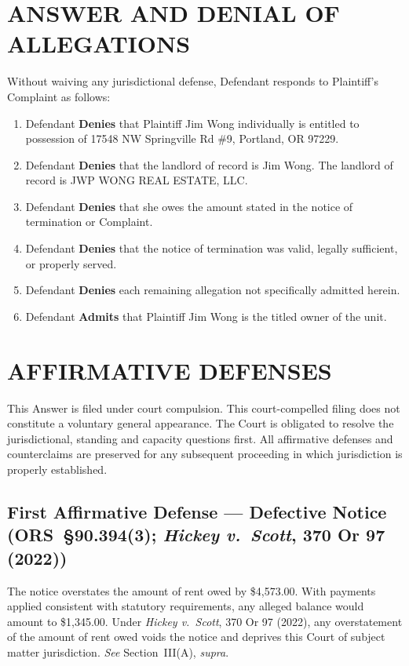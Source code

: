 \documentclass[10pt,letterpaper,oneside]{extarticle}
\begin{document}
\section{\textbf{ANSWER AND DENIAL OF ALLEGATIONS}}
Without waiving any jurisdictional defense, Defendant
responds to Plaintiff's Complaint as follows:
\begin{enumerate}[label=\arabic*.,leftmargin=.5in,nosep]
	\item Defendant \textbf{Denies} that Plaintiff Jim Wong
	individually is entitled to possession of 17548 NW
	Springville Rd \#9, Portland, OR 97229.
	\item Defendant \textbf{Denies} that the landlord of
	record is Jim Wong. The landlord of record is JWP WONG
	REAL ESTATE, LLC.
	\item Defendant \textbf{Denies} that she owes the
	amount stated in the notice of termination or Complaint.
	\item Defendant \textbf{Denies} that the notice of
	termination was valid, legally sufficient, or properly
	served.
	\item Defendant \textbf{Denies} each remaining
	allegation not specifically admitted herein.
	\item Defendant \textbf{Admits} that Plaintiff Jim Wong
	is the titled owner of the unit.
\end{enumerate}
\section{\textbf{AFFIRMATIVE DEFENSES}}
\indent This Answer is filed under court compulsion. This
court-compelled filing does not constitute a voluntary
general appearance. The Court is obligated to resolve the
jurisdictional, standing and capacity questions first. All affirmative defenses and
counterclaims are preserved for any subsequent proceeding
in which jurisdiction is properly established.
\subsection{\textbf{First Affirmative Defense ---
		Defective Notice
		(ORS~\S90.394(3); \textit{Hickey v.\ Scott},
		370 Or 97 (2022))}}
The notice overstates the amount of rent owed by \$4,573.00.
With payments applied consistent with statutory requirements, any alleged balance would amount to \$1,345.00. Under
\textit{Hickey v.\ Scott}, 370 Or 97 (2022), any
overstatement of the amount of rent owed voids the notice
and deprives this Court of subject matter jurisdiction.
\textit{See} Section~III(A), \textit{supra}.
\end{document}
